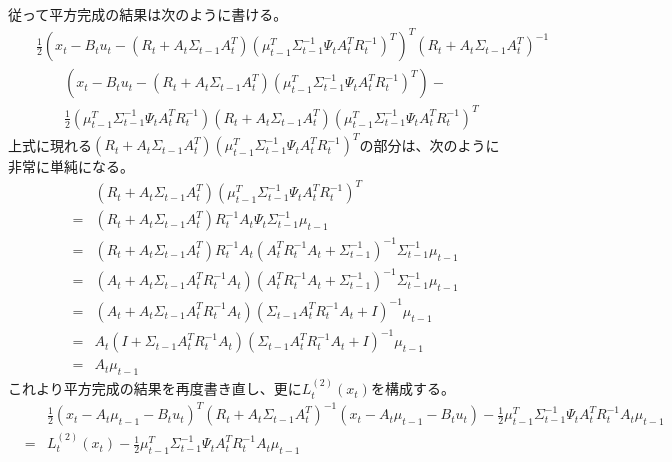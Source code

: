 \documentclass[dvipdfmx,a4paper]{jsarticle}
\begin{document}
従って平方完成の結果は次のように書ける。
\begin{eqnarray}
	&& \frac{1}{2} \left( x_t - B_t u_t - \left( R_t + A_t \Sigma_{t - 1} A_t^T \right) \left( \mu_{t - 1}^T \Sigma_{t - 1}^{-1} \Psi_t A_t^T R_t^{-1} \right)^T \right)^T \left( R_t + A_t \Sigma_{t - 1} A_t^T \right)^{-1} \nonumber \\
	&& \qquad \left( x_t - B_t u_t - \left( R_t + A_t \Sigma_{t - 1} A_t^T \right) \left( \mu_{t - 1}^T \Sigma_{t - 1}^{-1} \Psi_t A_t^T R_t^{-1} \right)^T \right) - \nonumber \\
	&& \qquad \frac{1}{2} \left( \mu_{t - 1}^T \Sigma_{t - 1}^{-1} \Psi_t A_t^T R_t^{-1} \right) \left( R_t + A_t \Sigma_{t - 1} A_t^T \right) \left( \mu_{t - 1}^T \Sigma_{t - 1}^{-1} \Psi_t A_t^T R_t^{-1} \right)^T
\end{eqnarray}
上式に現れる$\left( R_t + A_t \Sigma_{t - 1} A_t^T \right) \left( \mu_{t - 1}^T \Sigma_{t - 1}^{-1} \Psi_t A_t^T R_t^{-1} \right)^T$の部分は、次のように非常に単純になる。
\begin{eqnarray}
	&& \left( R_t + A_t \Sigma_{t - 1} A_t^T \right) \left( \mu_{t - 1}^T \Sigma_{t - 1}^{-1} \Psi_t A_t^T R_t^{-1} \right)^T \nonumber \\
	&=& \left( R_t + A_t \Sigma_{t - 1} A_t^T \right) R_t^{-1} A_t \Psi_t \Sigma_{t - 1}^{-1} \mu_{t - 1} \nonumber \\
	&=& \left( R_t + A_t \Sigma_{t - 1} A_t^T \right) R_t^{-1} A_t \left( A_t^T R_t^{-1} A_t + \Sigma_{t - 1}^{-1} \right)^{-1} \Sigma_{t - 1}^{-1} \mu_{t - 1} \nonumber \\
	&=& \left( A_t + A_t \Sigma_{t - 1} A_t^T R_t^{-1} A_t \right) \left( A_t^T R_t^{-1} A_t + \Sigma_{t - 1}^{-1} \right)^{-1} \Sigma_{t - 1}^{-1} \mu_{t - 1} \nonumber \\
	&=& \left( A_t + A_t \Sigma_{t - 1} A_t^T R_t^{-1} A_t \right) \left( \Sigma_{t - 1} A_t^T R_t^{-1} A_t + I \right)^{-1} \mu_{t - 1} \nonumber \\
	&=& A_t \left( I + \Sigma_{t - 1} A_t^T R_t^{-1} A_t \right) \left( \Sigma_{t - 1} A_t^T R_t^{-1} A_t + I \right)^{-1} \mu_{t - 1} \nonumber \\
	&=& A_t \mu_{t - 1}
\end{eqnarray}
これより平方完成の結果を再度書き直し、更に$L_t^{(2)}(x_t)$を構成する。
\begin{eqnarray}
	&& \frac{1}{2} \left( x_t - A_t \mu_{t - 1} - B_t u_t \right)^T \left( R_t + A_t \Sigma_{t - 1} A_t^T \right)^{-1} \left( x_t - A_t \mu_{t - 1} - B_t u_t \right) - \frac{1}{2} \mu_{t - 1}^T \Sigma_{t - 1}^{-1} \Psi_t A_t^T R_t^{-1} A_t \mu_{t - 1} \nonumber \\
	&=& L_t^{(2)}(x_t) - \frac{1}{2} \mu_{t - 1}^T \Sigma_{t - 1}^{-1} \Psi_t A_t^T R_t^{-1} A_t \mu_{t - 1}
\end{eqnarray}
\end{document}
